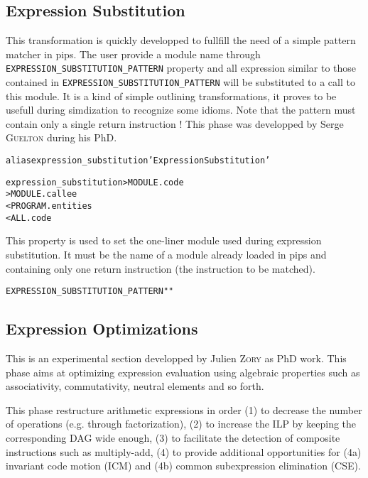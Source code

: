 \documentclass[a4paper]{report}
\newenvironment{PipsProp}{\begin{alltt}}{\end{alltt}}
\newenvironment{PipsMake}{\begin{alltt}}{\end{alltt}}
\begin{document}
\subsection{Expression Substitution}

This transformation is quickly developped to fullfill the need of a simple pattern matcher in pips.
The user provide a module name through \verb|EXPRESSION_SUBSTITUTION_PATTERN| property and all expression similar to those contained in \verb|EXPRESSION_SUBSTITUTION_PATTERN| will be substituted to a call to this module.
It is  a kind of simple outlining transformations, it proves to be usefull during simdization to recognize some idioms. Note that the pattern must contain only a single return instruction !
This phase was developped by Serge \textsc{Guelton} during his PhD.

\begin{PipsMake}
alias expression_substitution 'Expression Substitution'

expression_substitution > MODULE.code
        > MODULE.callee
        < PROGRAM.entities
        < ALL.code
\end{PipsMake}

This property is used to set the one-liner module used during
expression substitution. It must be the name of a module already
loaded in pips and containing only one return instruction (the
instruction to be matched).
\begin{PipsProp}
EXPRESSION_SUBSTITUTION_PATTERN ""
\end{PipsProp}


\subsection{Expression Optimizations}
\label{subsection-expression-optimizations}

This is an experimental section developped by Julien \textsc{Zory} as PhD work.
This phase aims at optimizing expression evaluation using algebraic
properties such as associativity, commutativity, neutral elements and so
forth.

This phase restructure arithmetic expressions in order (1) to decrease the
number of operations (e.g. through factorization), (2) to increase the ILP
by keeping the corresponding DAG wide enough, (3) to facilitate the
detection of composite instructions such as multiply-add, (4) to provide
additional opportunities for (4a) invariant code motion (ICM) and (4b)
common subexpression elimination (CSE).
\end{document}
